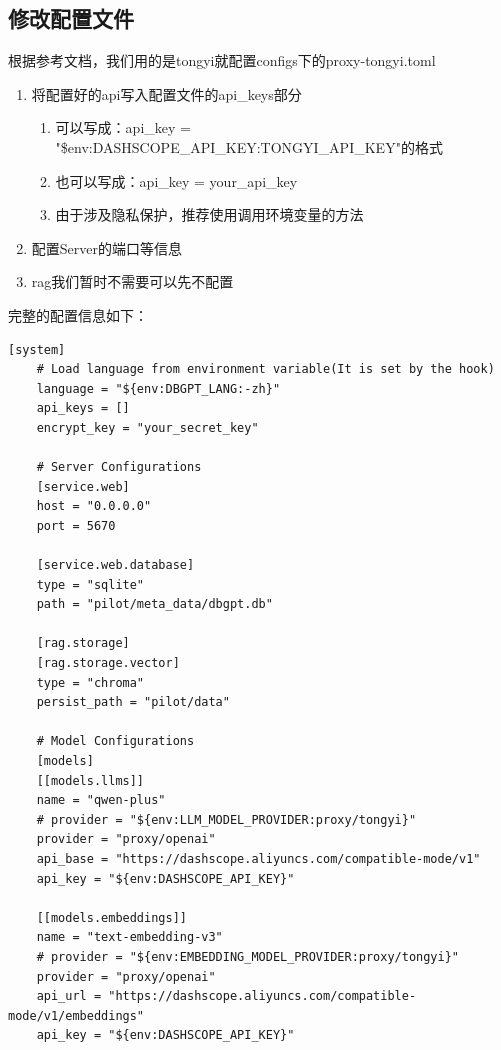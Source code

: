 \documentclass{article}
\begin{document}
	\subsection{修改配置文件}
	
	根据参考文档，我们用的是tongyi就配置configs下的proxy-tongyi.toml
	
	\begin{enumerate}[noitemsep, label={\arabic*.}]
		\item 将配置好的api写入配置文件的api\_keys部分
		\begin{enumerate}[noitemsep, label={\arabic{enumi}.\arabic*}]
			\item 可以写成：api\_key = "\${env:DASHSCOPE\_API\_KEY:TONGYI\_API\_KEY}"的格式
			\item 也可以写成：api\_key = {your\_api\_key}
			\item 由于涉及隐私保护，推荐使用调用环境变量的方法
		\end{enumerate}\textbf{}
		\item 配置Server的端口等信息
		\item rag我们暂时不需要可以先不配置
	\end{enumerate}\textbf{}
	
	完整的配置信息如下：
	
	\begin{lstlisting}[title=dbgpt-proxy-tongyi.toml, tabsize=4]
	[system]
	# Load language from environment variable(It is set by the hook)
	language = "${env:DBGPT_LANG:-zh}"
	api_keys = []
	encrypt_key = "your_secret_key"
	
	# Server Configurations
	[service.web]
	host = "0.0.0.0"
	port = 5670
	
	[service.web.database]
	type = "sqlite"
	path = "pilot/meta_data/dbgpt.db"
	
	[rag.storage]
	[rag.storage.vector]
	type = "chroma"
	persist_path = "pilot/data"
	
	# Model Configurations
	[models]
	[[models.llms]]
	name = "qwen-plus"
	# provider = "${env:LLM_MODEL_PROVIDER:proxy/tongyi}"
	provider = "proxy/openai"
	api_base = "https://dashscope.aliyuncs.com/compatible-mode/v1"
	api_key = "${env:DASHSCOPE_API_KEY}"
	
	[[models.embeddings]]
	name = "text-embedding-v3"
	# provider = "${env:EMBEDDING_MODEL_PROVIDER:proxy/tongyi}"
	provider = "proxy/openai"
	api_url = "https://dashscope.aliyuncs.com/compatible-mode/v1/embeddings"
	api_key = "${env:DASHSCOPE_API_KEY}"
	\end{lstlisting}
	
\end{document}
